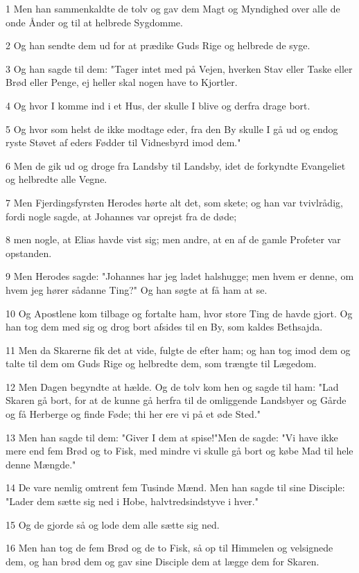 \par 1 Men han sammenkaldte de tolv og gav dem Magt og Myndighed over alle de onde Ånder og til at helbrede Sygdomme.
\par 2 Og han sendte dem ud for at prædike Guds Rige og helbrede de syge.
\par 3 Og han sagde til dem: "Tager intet med på Vejen, hverken Stav eller Taske eller Brød eller Penge, ej heller skal nogen have to Kjortler.
\par 4 Og hvor I komme ind i et Hus, der skulle I blive og derfra drage bort.
\par 5 Og hvor som helst de ikke modtage eder, fra den By skulle I gå ud og endog ryste Støvet af eders Fødder til Vidnesbyrd imod dem."
\par 6 Men de gik ud og droge fra Landsby til Landsby, idet de forkyndte Evangeliet og helbredte alle Vegne.
\par 7 Men Fjerdingsfyrsten Herodes hørte alt det, som skete; og han var tvivlrådig, fordi nogle sagde, at Johannes var oprejst fra de døde;
\par 8 men nogle, at Elias havde vist sig; men andre, at en af de gamle Profeter var opstanden.
\par 9 Men Herodes sagde: "Johannes har jeg ladet halshugge; men hvem er denne, om hvem jeg hører sådanne Ting?" Og han søgte at få ham at se.
\par 10 Og Apostlene kom tilbage og fortalte ham, hvor store Ting de havde gjort. Og han tog dem med sig og drog bort afsides til en By, som kaldes Bethsajda.
\par 11 Men da Skarerne fik det at vide, fulgte de efter ham; og han tog imod dem og talte til dem om Guds Rige og helbredte dem, som trængte til Lægedom.
\par 12 Men Dagen begyndte at hælde. Og de tolv kom hen og sagde til ham: "Lad Skaren gå bort, for at de kunne gå herfra til de omliggende Landsbyer og Gårde og få Herberge og finde Føde; thi her ere vi på et øde Sted."
\par 13 Men han sagde til dem: "Giver I dem at spise!"Men de sagde: "Vi have ikke mere end fem Brød og to Fisk, med mindre vi skulle gå bort og købe Mad til hele denne Mængde."
\par 14 De vare nemlig omtrent fem Tusinde Mænd. Men han sagde til sine Disciple: "Lader dem sætte sig ned i Hobe, halvtredsindstyve i hver."
\par 15 Og de gjorde så og lode dem alle sætte sig ned.
\par 16 Men han tog de fem Brød og de to Fisk, så op til Himmelen og velsignede dem, og han brød dem og gav sine Disciple dem at lægge dem for Skaren.
